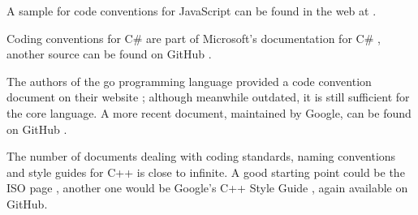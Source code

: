A sample for code conventions for JavaScript can be found in the web at \autocite{Crockford:JAVASCRIPT_CODE_CONVENTIONS}.

Coding conventions for C\# are part of Microsoft's documentation for C\# \autocite{MICROSOFT:CsharpDocumentation:coding-style}, another source can be found on GitHub \autocite{Taranov:CsharpCodingStandards}.

The authors of the go programming language provided a code convention document on their website \autocite{GO_DEV:EffectiveGo}; although meanwhile outdated, it is still sufficient for the core language. A more recent document, maintained by Google, can be found on GitHub \autocite{Google:GoStyleGuide}.

The number of documents dealing with coding standards, naming conventions and style guides for \mbox{C++} is close to infinite. A good starting point could be the ISO page \autocite{ISO:CppCodingStandards}, another one would be Google's \mbox{C++} Style Guide \autocite{Google:CppStyleGuide}, again available on GitHub.

